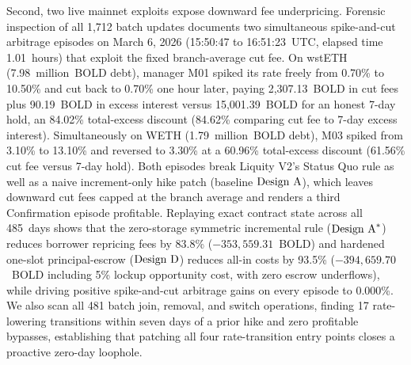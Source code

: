 Second, two live mainnet exploits expose downward fee underpricing. Forensic inspection of all 1,712 batch updates documents two simultaneous spike-and-cut arbitrage episodes on March 6, 2026 (15:50:47 to 16:51:23~UTC, elapsed time 1.01~hours) that exploit the fixed branch-average cut fee. On wstETH (7.98~million~BOLD debt), manager M01 spiked its rate freely from 0.70\% to 10.50\% and cut back to 0.70\% one hour later, paying 2,307.13~BOLD in cut fees plus 90.19~BOLD in excess interest versus 15,001.39~BOLD for an honest 7-day hold, an 84.02\% total-excess discount (84.62\% comparing cut fee to 7-day excess interest). Simultaneously on WETH (1.79~million~BOLD debt), M03 spiked from 3.10\% to 13.10\% and reversed to 3.30\% at a 60.96\% total-excess discount (61.56\% cut fee versus 7-day hold). Both episodes break Liquity V2's Status Quo rule as well as a naive increment-only hike patch (baseline $\text{Design A}$), which leaves downward cut fees capped at the branch average and renders a third Confirmation episode profitable. Replaying exact contract state across all 485~days shows that the zero-storage symmetric incremental rule ($\text{Design A}^*$) reduces borrower repricing fees by 83.8\% ($-353{,}559.31$~BOLD) and hardened one-slot principal-escrow ($\text{Design D}$) reduces all-in costs by 93.5\% ($-394{,}659.70$~BOLD including 5\% lockup opportunity cost, with zero escrow underflows), while driving positive spike-and-cut arbitrage gains on every episode to 0.000\%. We also scan all 481 batch join, removal, and switch operations, finding 17 rate-lowering transitions within seven days of a prior hike and zero profitable bypasses, establishing that patching all four rate-transition entry points closes a proactive zero-day loophole.

